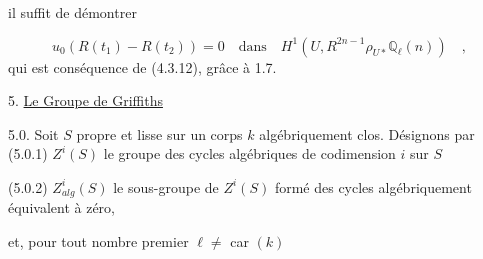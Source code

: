 \begin{center}
\end{center}
il suffit de démontrer

\begin{equation*}
u_0(R(t_1) - R(t_2)) = 0 \quad \text{dans} \quad H^1(U,R^{2n-1}\rho_{U*}\mathbb{Q}_\ell(n)) \quad ,
\end{equation*}
qui est conséquence de (4.3.12), grâce à 1.7.


5.  \underline{Le Groupe de Griffiths}

5.0.  Soit  $S$  propre et lisse sur un corps  $k$  algébriquement clos. Désignons par
(5.0.1)   $Z^i(S)$  le groupe des cycles algébriques de codimension $i$  sur $S$

(5.0.2)   $Z^i_{alg}(S)$ le sous-groupe de  $Z^i(S)$  formé des cycles algébriquement équivalent à zéro,

et, pour tout nombre premier  $\ell \neq$ car $(k)$

